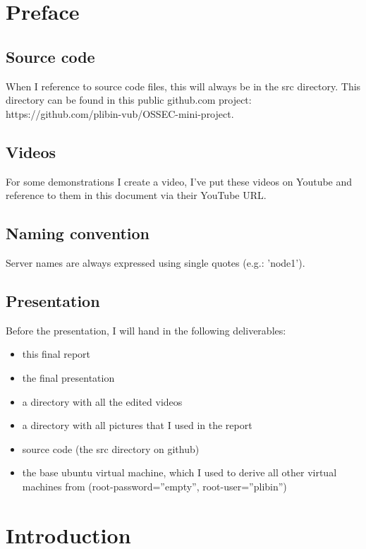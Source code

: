 \documentclass[12pt]{report}
\begin{document}

\tableofcontents %

\newpage %

\chapter*{Preface}
\section{Source code}
When I reference to source code files, this will always be in the src
directory. This directory can be found in this public github.com
project: https://github.com/plibin-vub/OSSEC-mini-project.
\section{Videos}
For some demonstrations I create a video, I've put these videos on
Youtube and reference to them in this document via their YouTube URL.
\section{Naming convention}
Server names are always expressed using single quotes (e.g.: 'node1').
\section{Presentation}
Before the presentation, I will hand in the following deliverables:
\begin{itemize}
\item this final report
\item the final presentation
\item a directory with all the edited videos
\item a directory with all pictures that I used in the report
\item source code (the src directory on github)
\item the base ubuntu virtual machine, which I used to derive all
  other virtual machines from (root-password=''empty'', root-user=''plibin'')
\end{itemize}

\chapter{Introduction} %
\end{document}
